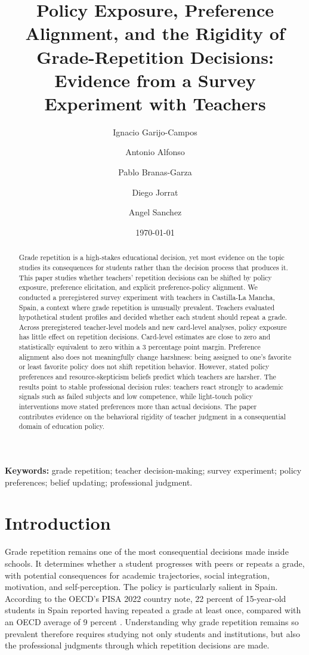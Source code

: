 \documentclass[12pt,a4paper]{article}
\title{Policy Exposure, Preference Alignment, and the Rigidity of Grade-Repetition Decisions: Evidence from a Survey Experiment with Teachers}
\author{
Ignacio Garijo-Campos \and
Antonio Alfonso \and
Pablo Branas-Garza \and
Diego Jorrat \and
Angel Sanchez
}
\date{\today}
\begin{document}
\maketitle

\begin{abstract}
Grade repetition is a high-stakes educational decision, yet most evidence on the topic studies its consequences for students rather than the decision process that produces it. This paper studies whether teachers' repetition decisions can be shifted by policy exposure, preference elicitation, and explicit preference-policy alignment. We conducted a preregistered survey experiment with teachers in Castilla-La Mancha, Spain, a context where grade repetition is unusually prevalent. Teachers evaluated hypothetical student profiles and decided whether each student should repeat a grade. Across preregistered teacher-level models and new card-level analyses, policy exposure has little effect on repetition decisions. Card-level estimates are close to zero and statistically equivalent to zero within a 3 percentage point margin. Preference alignment also does not meaningfully change harshness: being assigned to one's favorite or least favorite policy does not shift repetition behavior. However, stated policy preferences and resource-skepticism beliefs predict which teachers are harsher. The results point to stable professional decision rules: teachers react strongly to academic signals such as failed subjects and low competence, while light-touch policy interventions move stated preferences more than actual decisions. The paper contributes evidence on the behavioral rigidity of teacher judgment in a consequential domain of education policy.
\end{abstract}

\noindent\textbf{Keywords:} grade repetition; teacher decision-making; survey experiment; policy preferences; belief updating; professional judgment.

\section{Introduction}

Grade repetition remains one of the most consequential decisions made inside schools. It determines whether a student progresses with peers or repeats a grade, with potential consequences for academic trajectories, social integration, motivation, and self-perception. The policy is particularly salient in Spain. According to the OECD's PISA 2022 country note, 22 percent of 15-year-old students in Spain reported having repeated a grade at least once, compared with an OECD average of 9 percent \citep{oecd2023spain}. Understanding why grade repetition remains so prevalent therefore requires studying not only students and institutions, but also the professional judgments through which repetition decisions are made.
\end{document}
